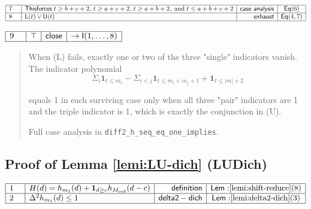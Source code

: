\documentclass[11pt,reqno]{amsart}
\begin{document}
\nointerlineskip\noindent$%
\begin{array}{|m{0.5cm}|l|r|c|}
\hline
7 & \mathsf{This forces}\;t\ge b+c+2,\,t\ge a+c+2,\,t\ge a+b+2,\;\text{and}%
\;t\le a+b+c+2 & \mathsf{case\ analysis} & \mathsf{Eq}(6) \\ \hline
8 & \mathsf{L}(t)\vee\mathsf{U}(t) & \mathsf{exhaust} & \mathsf{Eq}(4,7) \\ 
\hline
\end{array}%
$

\nointerlineskip\noindent $%
\begin{array}{|m{0.5cm}|l|r|c|}
\hline
9 & \top  & \mathsf{close} & \rightarrow \mathsf{I}(1,\dots ,8) \\ \hline
\end{array}%
$

\bigskip 

\begin{quotation}
\medskip 
\noindent%
When (L) fails, exactly one or two of the three "single" indicators vanish.
The indicator polynomial 
\begin{equation*}
\Sigma _{i}\mathbf{1}_{t\leq m_{i}}-\Sigma _{i<j}\mathbf{1}_{t\leq
m_{i}+m_{j}+1}+\mathbf{1}_{t\leq |m|+2}
\end{equation*}

\bigskip 

\noindent%
equals 1 in each surviving case only when all three "pair" indicators are 1
and the triple indicator is 1, which is exactly the conjunction in (U). 

\noindent%
Full case analysis in \texttt{diff2\_h\_seq\_eq\_one\_implies}.
\end{quotation}

\medskip

\subsection*{Proof of Lemma \protect\ref{lemi:LU-dich} (\textsf{LUDich})}

\noindent $%
\begin{array}{|m{0.5cm}|l|r|c|}
\hline
1 & H(d)=h_{m_{1}}(d)+\mathbf{1}_{d\geq c}h_{M_{\mathrm{red}}}(d-c) & 
\mathsf{definition} & \mathsf{Lem:}\ref{lemi:shift-reduce}(8) \\ \hline
2 & \Delta ^{2}h_{m_{1}}(d)\leq 1 & \mathsf{delta2-dich} & \mathsf{Lem:}\ref%
{lemi:delta2-dich}(3) \\ \hline
\end{array}%
$
\end{document}
